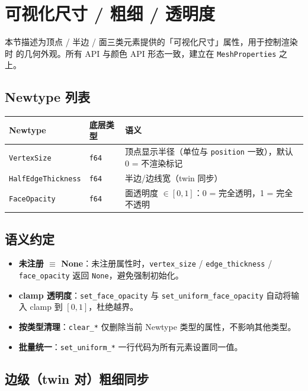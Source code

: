 \documentclass[11pt,a4paper]{article}
\begin{document}
\section{可视化尺寸 / 粗细 / 透明度}
\label{sec:size-thickness-opacity}

本节描述为顶点 / 半边 / 面三类元素提供的「可视化尺寸」属性，用于控制渲染时
的几何外观。所有 API 与颜色 API 形态一致，建立在 \texttt{MeshProperties} 之上。

\subsection{Newtype 列表}

\begin{longtable}{@{}llp{5.2cm}@{}}
  \toprule
  \textbf{Newtype} & \textbf{底层类型} & \textbf{语义} \\
  \midrule
  \endhead
  \texttt{VertexSize}        & \texttt{f64} & 顶点显示半径（单位与 \texttt{position} 一致），默认 0 = 不渲染标记 \\
  \texttt{HalfEdgeThickness} & \texttt{f64} & 半边/边线宽（twin 同步） \\
  \texttt{FaceOpacity}       & \texttt{f64} & 面透明度 $\in [0, 1]$：0 = 完全透明，1 = 完全不透明 \\
  \bottomrule
\end{longtable}

\subsection{语义约定}

\begin{sloppypar}
\begin{itemize}
  \item \textbf{未注册 $\equiv$ None}：未注册属性时，\texttt{vertex\_size} / \texttt{edge\_thickness} / \texttt{face\_opacity} 返回 \texttt{None}，避免强制初始化。
  \item \textbf{clamp 透明度}：\texttt{set\_face\_opacity} 与 \texttt{set\_uniform\_face\_opacity} 自动将输入 clamp 到 $[0, 1]$，杜绝越界。
  \item \textbf{按类型清理}：\texttt{clear\_*} 仅删除当前 Newtype 类型的属性，不影响其他类型。
  \item \textbf{批量统一}：\texttt{set\_uniform\_*} 一行代码为所有元素设置同一值。
\end{itemize}
\end{sloppypar}

\subsection{边级（twin 对）粗细同步}
\end{document}
